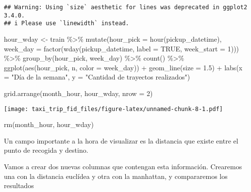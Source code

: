 \documentclass[
]{article}
\newenvironment{Shaded}{\begin{snugshade}}{\end{snugshade}}
\newcommand{\AttributeTok}[1]{\textcolor[rgb]{0.77,0.63,0.00}{#1}}
\newcommand{\ConstantTok}[1]{\textcolor[rgb]{0.00,0.00,0.00}{#1}}
\newcommand{\DecValTok}[1]{\textcolor[rgb]{0.00,0.00,0.81}{#1}}
\newcommand{\FloatTok}[1]{\textcolor[rgb]{0.00,0.00,0.81}{#1}}
\newcommand{\FunctionTok}[1]{\textcolor[rgb]{0.00,0.00,0.00}{#1}}
\newcommand{\NormalTok}[1]{#1}
\newcommand{\OtherTok}[1]{\textcolor[rgb]{0.56,0.35,0.01}{#1}}
\newcommand{\SpecialCharTok}[1]{\textcolor[rgb]{0.00,0.00,0.00}{#1}}
\newcommand{\StringTok}[1]{\textcolor[rgb]{0.31,0.60,0.02}{#1}}
\begin{document}
\begin{verbatim}
## Warning: Using `size` aesthetic for lines was deprecated in ggplot2 3.4.0.
## i Please use `linewidth` instead.
\end{verbatim}

\begin{Shaded}
\begin{Highlighting}[]
\NormalTok{hour\_wday }\OtherTok{\textless{}{-}}\NormalTok{ train }\SpecialCharTok{\%\textgreater{}\%}
  \FunctionTok{mutate}\NormalTok{(}\AttributeTok{hour\_pick =} \FunctionTok{hour}\NormalTok{(pickup\_datetime),}
         \AttributeTok{week\_day =} \FunctionTok{factor}\NormalTok{(}\FunctionTok{wday}\NormalTok{(pickup\_datetime, }\AttributeTok{label =} \ConstantTok{TRUE}\NormalTok{, }\AttributeTok{week\_start =} \DecValTok{1}\NormalTok{))) }\SpecialCharTok{\%\textgreater{}\%}
  \FunctionTok{group\_by}\NormalTok{(hour\_pick, week\_day) }\SpecialCharTok{\%\textgreater{}\%}
  \FunctionTok{count}\NormalTok{() }\SpecialCharTok{\%\textgreater{}\%}
  \FunctionTok{ggplot}\NormalTok{(}\FunctionTok{aes}\NormalTok{(hour\_pick, n, }\AttributeTok{color =}\NormalTok{ week\_day)) }\SpecialCharTok{+}
  \FunctionTok{geom\_line}\NormalTok{(}\AttributeTok{size =} \FloatTok{1.5}\NormalTok{) }\SpecialCharTok{+}
  \FunctionTok{labs}\NormalTok{(}\AttributeTok{x =} \StringTok{"Día de la semana"}\NormalTok{, }\AttributeTok{y =} \StringTok{"Cantidad de trayectos realizados"}\NormalTok{)}

\FunctionTok{grid.arrange}\NormalTok{(month\_hour, hour\_wday, }\AttributeTok{nrow =} \DecValTok{2}\NormalTok{)}
\end{Highlighting}
\end{Shaded}

\texttt{[image: taxi\_trip\_fid\_files/figure-latex/unnamed-chunk-8-1.pdf]}

\begin{Shaded}
\begin{Highlighting}[]
\FunctionTok{rm}\NormalTok{(month\_hour, hour\_wday)}
\end{Highlighting}
\end{Shaded}

Un campo importante a la hora de visualizar es la distancia que existe
entre el punto de recogida y destino.

Vamos a crear dos nuevas columnas que contengan esta información.
Crearemos una con la distancia euclídea y otra con la manhattan, y
compararemos los resultados
\end{document}
